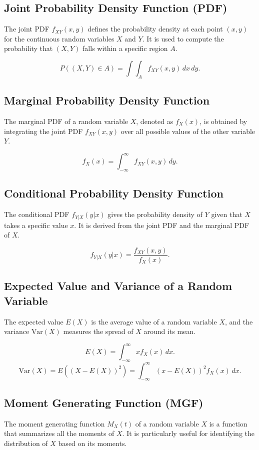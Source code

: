 \documentclass[12pt]{article}
\begin{document}
\subsection*{Joint Probability Density Function (PDF)}
The joint PDF $f_{XY}(x, y)$ defines the probability density at each point $(x, y)$ for the continuous random variables $X$ and $Y$. It is used to compute the probability that $(X, Y)$ falls within a specific region $A$.

\[
P((X, Y) \in A) = \int \int_A f_{XY}(x, y) \, dx \, dy.
\]

\subsection*{Marginal Probability Density Function}
The marginal PDF of a random variable $X$, denoted as $f_X(x)$, is obtained by integrating the joint PDF $f_{XY}(x, y)$ over all possible values of the other variable $Y$.

\[
f_X(x) = \int_{-\infty}^{\infty} f_{XY}(x, y) \, dy.
\]

\subsection*{Conditional Probability Density Function}
The conditional PDF $f_{Y|X}(y|x)$ gives the probability density of $Y$ given that $X$ takes a specific value $x$. It is derived from the joint PDF and the marginal PDF of $X$.

\[
f_{Y|X}(y|x) = \frac{f_{XY}(x, y)}{f_X(x)}.
\]

\subsection*{Expected Value and Variance of a Random Variable}
The expected value $E(X)$ is the average value of a random variable $X$, and the variance $\text{Var}(X)$ measures the spread of $X$ around its mean.

\[
E(X) = \int_{-\infty}^{\infty} x f_X(x) \, dx.
\]
\[
\text{Var}(X) = E((X - E(X))^2) = \int_{-\infty}^{\infty} (x - E(X))^2 f_X(x) \, dx.
\]

\subsection*{Moment Generating Function (MGF)}
The moment generating function $M_X(t)$ of a random variable $X$ is a function that summarizes all the moments of $X$. It is particularly useful for identifying the distribution of $X$ based on its moments.
\end{document}

